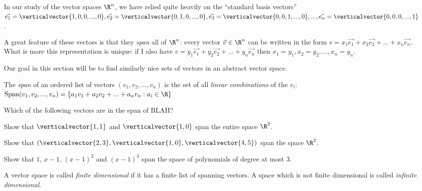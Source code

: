 
\begin{Basis and Dimension}

In our study of the vector spaces $\R^n$, we have relied quite heavily on the ``standard basis vectors'' $\vec{e_1}  =\verticalvector{1,0,0,...,0}, 
\vec{e_2}  =\verticalvector{0,1,0,...,0}, \vec{e_3}  =\verticalvector{0,0,1,...,0},..., \vec{e_n}  =\verticalvector{0,0,0,...,1}$.  

A great feature of these vectors is that they \textit{span} all of $\R^n$:  every vector $\vec{v} \in \R^n$ can be written in the form
 $v = x_1\vec{e_1} +x_2\vec{e_2}+...+x_n\vec{e_n}$.  What is more this representation is unique:  if I also have $v = y_1\vec{e_1} +y_2\vec{e_2}+...+y_n\vec{e_n}$
 then $x_1 = y_1, x_2 = y_2, ..., x_n=y_n$.
 
 Our goal in this section will be to find similarly nice sets of vectors in an abstract vector space.
 
 \begin{definition}
 	The \textit{span} of an ordered list of vectors $(v_1,v_2, ...,v_n)$ is the set of all \textit{linear combinations} of the $v_i$:
 	$\textrm{Span}(v_1,v_2, ...,v_n) = \{a_1v_1+a_2v_2+...+a_nv_n: a_i \in \R\}$
 \end{definition}
 
 \begin{question}
 	Which of the following vectors are in the span of BLAH?
 \end{question}
 
 \begin{question}
 	Show that $\verticalvector{1,1}$ and $\verticalvector{1,0}$ span the entire space $\R^2$.
 \end{question}
 
  \begin{question}
 	Show that $(\verticalvector{2,3},\verticalvector{1,0},\verticalvector{4,5})$ span the space $\R^2$.
 \end{question}
 
 \begin{question}
 	Show that $1$, $x-1$, $(x-1)^2$ and $(x-1)^3$ span the space of polynomials of degree at most $3$.
 \end{question}
 
  \begin{definition}
 	A vector space is called \textit{finite dimensional} if it has a finite list of spanning vectors.  A space which is not finite dimensional is called \textit{infinite dimensional}.
 \end{definition}
 

\end{Basis and Dimension}
